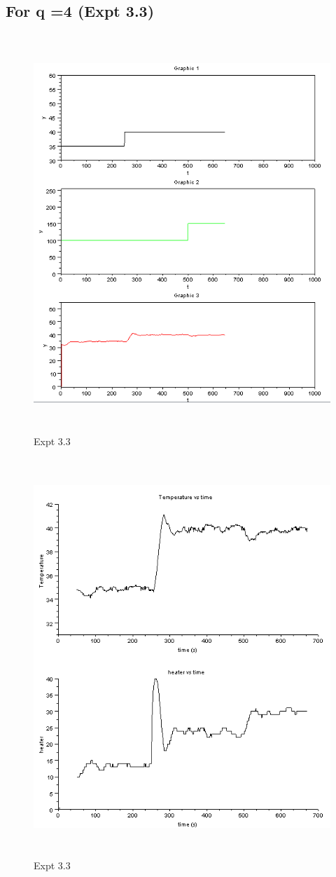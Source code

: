\subsection{For q =4 (Expt 3.3) }
\begin{figure}[H]
  \includegraphics[width=12cm, height=15cm]{mpc/3_3.PNG}
  \caption{Expt 3.3}
\end{figure}
\begin{figure}[H]
  \includegraphics[width=12cm, height=15cm]{mpc/3_3_heater_final.png}
  \caption{Expt 3.3}
\end{figure}



